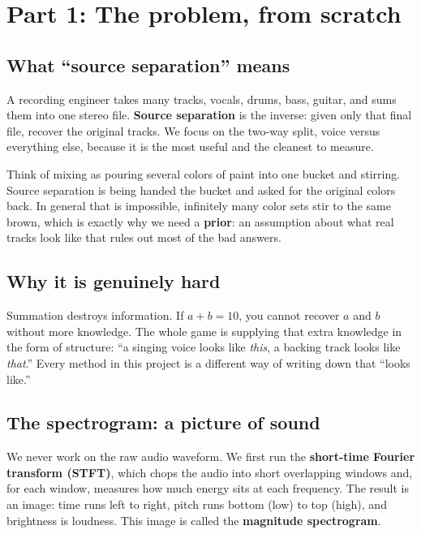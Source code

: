 \documentclass[11pt]{article}
\begin{document}
\section{Part 1: The problem, from scratch}

\subsection{What ``source separation'' means}
A recording engineer takes many tracks, vocals, drums, bass, guitar, and sums
them into one stereo file. \textbf{Source separation} is the inverse: given only
that final file, recover the original tracks. We focus on the two-way split, voice
versus everything else, because it is the most useful and the cleanest to measure.

\begin{analogy}
Think of mixing as pouring several colors of paint into one bucket and stirring.
Source separation is being handed the bucket and asked for the original colors
back. In general that is impossible, infinitely many color sets stir to the same
brown, which is exactly why we need a \textbf{prior}: an assumption about what real
tracks look like that rules out most of the bad answers.
\end{analogy}

\subsection{Why it is genuinely hard}
Summation destroys information. If $a+b=10$, you cannot recover $a$ and $b$ without
more knowledge. The whole game is supplying that extra knowledge in the form of
structure: ``a singing voice looks like \emph{this}, a backing track looks like
\emph{that}.'' Every method in this project is a different way of writing down that
``looks like.''

\subsection{The spectrogram: a picture of sound}
We never work on the raw audio waveform. We first run the \textbf{short-time
Fourier transform (STFT)}, which chops the audio into short overlapping windows and,
for each window, measures how much energy sits at each frequency. The result is an
image: time runs left to right, pitch runs bottom (low) to top (high), and
brightness is loudness. This image is called the \textbf{magnitude spectrogram}.
\end{document}
